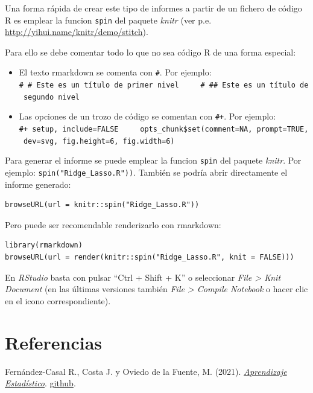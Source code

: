 \documentclass[
]{book}
\providecommand{\tightlist}{%
  \setlength{\itemsep}{0pt}\setlength{\parskip}{0pt}}
\theoremstyle{break}
\theoremstyle{nonumberplain}
\begin{document}
Una forma rápida de crear este tipo de informes a partir de un fichero de código R es emplear la funcion
\texttt{spin} del paquete \emph{knitr} (ver p.e. \url{http://yihui.name/knitr/demo/stitch}).

Para ello se debe comentar todo lo que no sea código R de una forma especial:

\begin{itemize}
\tightlist
\item
  El texto rmarkdown se comenta con \texttt{\#\textquotesingle{}}. Por ejemplo:
  \texttt{\#\textquotesingle{}\ \#\ Este\ es\ un\ título\ de\ primer\ nivel\ \ \ \ \ \#\textquotesingle{}\ \#\#\ Este\ es\ un\ título\ de\ segundo\ nivel}
\item
  Las opciones de un trozo de código se comentan con \texttt{\#+}. Por ejemplo:
  \texttt{\#+\ setup,\ include=FALSE\ \ \ \ \ opts\_chunk\$set(comment=NA,\ prompt=TRUE,\ dev=\textquotesingle{}svg\textquotesingle{},\ fig.height=6,\ fig.width=6)}
\end{itemize}

Para generar el informe se puede emplear la funcion \texttt{spin} del paquete \emph{knitr}. Por ejemplo: \texttt{spin("Ridge\_Lasso.R"))}.
También se podría abrir directamente el informe generado:

\begin{verbatim}
browseURL(url = knitr::spin("Ridge_Lasso.R"))
\end{verbatim}

Pero puede ser recomendable renderizarlo con rmarkdown:

\begin{verbatim}
library(rmarkdown)
browseURL(url = render(knitr::spin("Ridge_Lasso.R", knit = FALSE)))
\end{verbatim}

En \emph{RStudio} basta con pulsar ``Ctrl + Shift + K'' o seleccionar \emph{File \textgreater{} Knit Document} (en las últimas versiones también \emph{File \textgreater{} Compile Notebook} o hacer clic en el icono correspondiente).

\hypertarget{referencias}{%
\chapter*{Referencias}\label{referencias}}

Fernández-Casal R., Costa J. y Oviedo de la Fuente, M. (2021). \emph{\href{https://rubenfcasal.github.io/aprendizaje_estadistico}{Aprendizaje Estadístico}}. \href{https://github.com/rubenfcasal/aprendizaje_estadistico}{github}.
\end{document}

